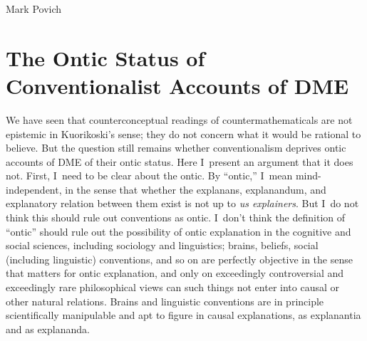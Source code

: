 \begin{artengenv}{Mark Povich}
\section{The Ontic Status of Conventionalist Accounts of DME}
We have seen that counterconceptual readings of countermathematicals are not epistemic in Kuorikoski's sense; they do not concern what it would be rational to believe. But the question still remains whether conventionalism deprives ontic accounts of DME of their ontic status. Here I~present an argument that it does not. First, I~need to be clear about the ontic. By ``ontic,'' I~mean mind-independent, in the sense that whether the explanans, explanandum, and explanatory relation between them exist is not up to \textit{us explainers}. But I~do not think this should rule out conventions as ontic. I~don't think the definition of ``ontic'' should rule out the possibility of ontic explanation in the cognitive and social sciences, including sociology and linguistics; brains, beliefs, social (including linguistic) conventions, and so on are perfectly objective in the sense that matters for ontic explanation, and only on exceedingly controversial and exceedingly rare philosophical views can such things not enter into causal or other natural relations. Brains and linguistic conventions are in principle scientifically manipulable and apt to figure in causal explanations, as explanantia and as explananda.


\end{artengenv}
